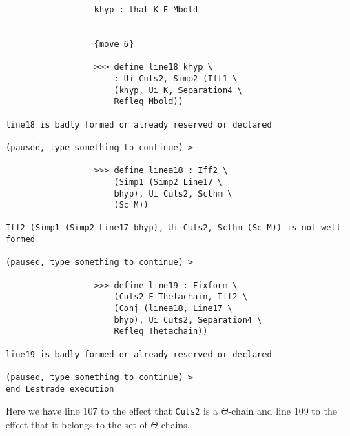 \documentclass[12pt]{article}
\begin{document}
\begin{verbatim}
                  khyp : that K E Mbold


                  {move 6}

                  >>> define line18 khyp \
                      : Ui Cuts2, Simp2 (Iff1 \
                      (khyp, Ui K, Separation4 \
                      Refleq Mbold))

line18 is badly formed or already reserved or declared

(paused, type something to continue) >

                  >>> define linea18 : Iff2 \
                      (Simp1 (Simp2 Line17 \
                      bhyp), Ui Cuts2, Scthm \
                      (Sc M))

Iff2 (Simp1 (Simp2 Line17 bhyp), Ui Cuts2, Scthm (Sc M)) is not well-formed

(paused, type something to continue) >

                  >>> define line19 : Fixform \
                      (Cuts2 E Thetachain, Iff2 \
                      (Conj (linea18, Line17 \
                      bhyp), Ui Cuts2, Separation4 \
                      Refleq Thetachain))

line19 is badly formed or already reserved or declared

(paused, type something to continue) >
end Lestrade execution
\end{verbatim}

Here we have line 107 to the effect that {\tt Cuts2} is a $\Theta$-chain and line 109 to the effect that it belongs to the set of $\Theta$-chains.
\end{document}
